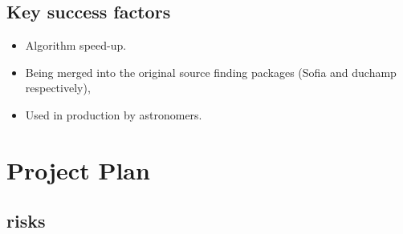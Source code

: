 \documentclass[prodmode,acmtecs]{acmsmall} \usepackage[ruled]{algorithm2e}
\begin{document}
\subsection{Key success factors}
\begin{itemize}
\item Algorithm speed-up.
\item Being merged into the original source finding packages (Sofia and duchamp respectively), 
\item Used in production by astronomers.
\end{itemize}


\section{Project Plan}

\subsection{risks}
\end{document}

